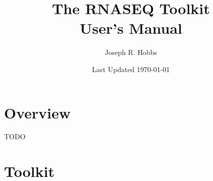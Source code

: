 \documentclass[12pt]{report}
\title{\Huge \textbf{The RNASEQ Toolkit} \\ \huge User's Manual}
\author{Joseph R. Hobbs}
\date{Last Updated \today}
\begin{document}
	\maketitle
	\tableofcontents
	
	\chapter{Overview}
	
	TODO
	
	\chapter{Toolkit}
\end{document}
